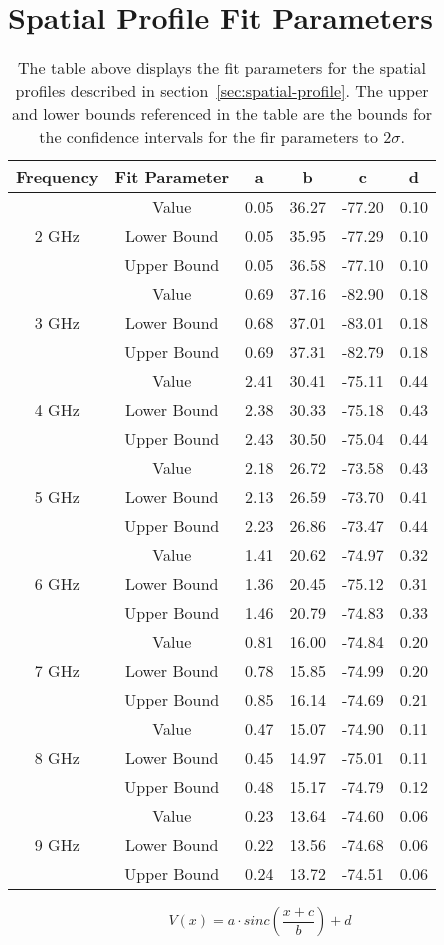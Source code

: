 \chapter{Spatial Profile Fit Parameters}
\label{app:spatial-fit-params}
	\def\arraystretch{1}
	\begin{table*}[!h]
		\centering
			\begin{tabular}{||c | c || c c c c||}
				\hline
				Frequency & Fit Parameter & a & b & c & d \\ [0.5ex]
				\hline\hline
				\multirow{3}{4em}{2 GHz} & Value & 0.05 & 36.27 & -77.20 & 0.10	 \\
				& Lower Bound & 0.05 & 35.95 & -77.29 & 0.10 \\
				& Upper Bound & 0.05 & 36.58 & -77.10 & 0.10 \\
				\hline
				\multirow{3}{4em}{3 GHz} & Value & 0.69 & 37.16 & -82.90 & 0.18  \\
				& Lower Bound & 0.68 & 37.01 & -83.01 & 0.18 \\
				& Upper Bound & 0.69 & 37.31 & -82.79 & 0.18 \\
				\hline
				\multirow{3}{4em}{4 GHz} & Value & 2.41 & 30.41 & -75.11 & 0.44 \\
				& Lower Bound & 2.38 & 30.33 & -75.18 & 0.43 \\
				& Upper Bound & 2.43 & 30.50 & -75.04 & 0.44 \\
				\hline
				\multirow{3}{4em}{5 GHz} & Value & 2.18 & 26.72 & -73.58 & 0.43 \\
				& Lower Bound & 2.13 & 26.59 & -73.70 & 0.41 \\
				& Upper Bound & 2.23 & 26.86 & -73.47 & 0.44 \\
				\hline
				\multirow{3}{4em}{6 GHz} & Value & 1.41 & 20.62 & -74.97 & 0.32 \\
				& Lower Bound & 1.36 & 20.45 & -75.12 & 0.31 \\
				& Upper Bound & 1.46 & 20.79 & -74.83 & 0.33 \\
				\hline
				\multirow{3}{4em}{7 GHz} & Value & 0.81 & 16.00 & -74.84 & 0.20 \\
				& Lower Bound & 0.78 & 15.85 & -74.99 & 0.20 \\
				& Upper Bound & 0.85 & 16.14 & -74.69 & 0.21 \\
				\hline
				\multirow{3}{4em}{8 GHz} & Value & 0.47 & 15.07 & -74.90 & 0.11 \\
				& Lower Bound & 0.45 & 14.97 & -75.01 & 0.11 \\
				& Upper Bound & 0.48 & 15.17 & -74.79 & 0.12 \\
				\hline
				\multirow{3}{4em}{9 GHz} & Value & 0.23 & 13.64 & -74.60 & 0.06 \\
				& Lower Bound & 0.22 & 13.56 & -74.68 & 0.06 \\
				& Upper Bound & 0.24 & 13.72 & -74.51 & 0.06 \\
				\hline
			\end{tabular}
			\caption[Spatial Profile Fit Parameters]{The table above displays the fit parameters for the spatial profiles described in section~\ref{sec:spatial-profile}. The upper and lower bounds referenced in the table are the bounds for the confidence intervals for the fir parameters to $2\sigma$.}
		\end{table*}
\begin{equation}
\label{eq:vxrestate}
V(x) = a\cdot sinc\left(\frac{x+c}{b}\right) + d
\end{equation}
\clearpage
\newpage
